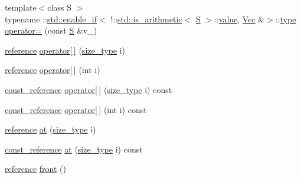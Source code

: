 \begin{DoxyCompactItemize}
\item 
{\footnotesize template$<$class S $>$ }\\typename \+::\hyperlink{structstd_1_1enable__if}{std\+::enable\+\_\+if}$<$ !\+::\hyperlink{structstd_1_1is__arithmetic}{std\+::is\+\_\+arithmetic}$<$ \hyperlink{ego_8cc_abde73cd36321648268fb4543509b996a}{S} $>$\+::\hyperlink{namespacetrimesh_ab10cc1052c9d1d1376d92211b6ca27dd}{value}, \hyperlink{classtrimesh_1_1Vec}{Vec} \&$>$\+::\hyperlink{namespacetrimesh_aa726c5bf9cff74a26269e8d258ae9e3d}{type} \hyperlink{classtrimesh_1_1Vec_a58662952592ba39f5415d2a6c5eea539}{operator=} (const \hyperlink{ego_8cc_abde73cd36321648268fb4543509b996a}{S} \&v\+\_\+)
\item 
\hyperlink{classtrimesh_1_1Vec_ad76bb92c986524d251998d6eae7d2825}{reference} \hyperlink{classtrimesh_1_1Vec_a95341351872775023d0166bcd3ae9cf0}{operator\mbox{[}$\,$\mbox{]}} (\hyperlink{classtrimesh_1_1Vec_a65397e05ed96e7723cf2d54dfff0ad0a}{size\+\_\+type} i)
\item 
\hyperlink{classtrimesh_1_1Vec_ad76bb92c986524d251998d6eae7d2825}{reference} \hyperlink{classtrimesh_1_1Vec_a790a163133b5e88649149111efac8a4e}{operator\mbox{[}$\,$\mbox{]}} (int i)
\item 
\hyperlink{classtrimesh_1_1Vec_a5ae45a41f93e04534f46b74dee5c6701}{const\+\_\+reference} \hyperlink{classtrimesh_1_1Vec_a8013cd5d8a791e48775f57d721014f0b}{operator\mbox{[}$\,$\mbox{]}} (\hyperlink{classtrimesh_1_1Vec_a65397e05ed96e7723cf2d54dfff0ad0a}{size\+\_\+type} i) const
\item 
\hyperlink{classtrimesh_1_1Vec_a5ae45a41f93e04534f46b74dee5c6701}{const\+\_\+reference} \hyperlink{classtrimesh_1_1Vec_a214b07d98d292daa53353fb3fc955ad5}{operator\mbox{[}$\,$\mbox{]}} (int i) const
\item 
\hyperlink{classtrimesh_1_1Vec_ad76bb92c986524d251998d6eae7d2825}{reference} \hyperlink{classtrimesh_1_1Vec_a51378784c1e7f96e6ce170620ccaacc6}{at} (\hyperlink{classtrimesh_1_1Vec_a65397e05ed96e7723cf2d54dfff0ad0a}{size\+\_\+type} i)
\item 
\hyperlink{classtrimesh_1_1Vec_a5ae45a41f93e04534f46b74dee5c6701}{const\+\_\+reference} \hyperlink{classtrimesh_1_1Vec_a405cc6bbca69a428ce2be45f77ab1123}{at} (\hyperlink{classtrimesh_1_1Vec_a65397e05ed96e7723cf2d54dfff0ad0a}{size\+\_\+type} i) const
\item 
\hyperlink{classtrimesh_1_1Vec_ad76bb92c986524d251998d6eae7d2825}{reference} \hyperlink{classtrimesh_1_1Vec_a0b8f0b5bb627a093ae7d6b04965328dc}{front} ()
\item 

\end{DoxyCompactItemize}

